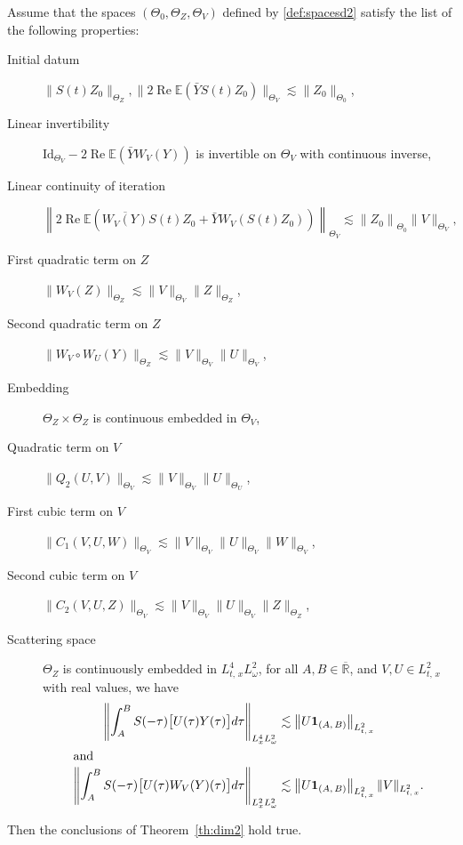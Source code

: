 \documentclass[10pt]{amsart}
\theoremstyle{definition}\newtheorem{defi}[theo]{Definition}\newtheorem{rema}[theo]{Remark}\newtheorem{exam}[theo]{Example}\newtheorem{exem}[theo]{Example}\newtheorem{nota}[theo]{Notation}
\newcommand{\R}{\mathbb{R}}
\newcommand{\E}{\mathbb{E}}
\DeclareMathOperator{\re}{Re}
\newcommand{\bfun}{\mathbf{1}}
\newcommand{\barR}{\overline{\R}}
\begin{document}
\begin{prop}\label{prop:principedim2}
Assume that the spaces $(\Theta_0,\Theta_Z,\Theta_V)$ defined by \eqref{def:spacesd2} satisfy the list of the following properties:
\begin{description}
\item[Initial datum] $\|S(t)Z_0\|_{\Theta_Z}, \|2\re \E(\bar Y S(t) Z_0)\|_{\Theta_V}\lesssim \|Z_0\|_{\Theta_0}$,
\item[Linear invertibility] $\textrm{Id}_{\Theta_V} - 2\re\E (\bar Y W_V(Y))$ is invertible on $\Theta_V$ with continuous inverse,
\item[Linear continuity of iteration]
\[
\left\|2\re \E \left(\overline{W_V(Y)} S(t) Z_0 + \bar Y W_V\left(S(t) Z_0\right)\right)\right\|_{\Theta_V} \lesssim \left\|Z_0\right\|_{\Theta_0} \|V\|_{\Theta_V},
\]
\item[First quadratic term on $Z$] $\|W_V(Z)\|_{\Theta_Z} \lesssim \|V\|_{\Theta_V}\|Z\|_{\Theta_Z}$,
\item[Second quadratic term on $Z$] $\|W_V\circ W_U (Y)\|_{\Theta_Z} \lesssim \|V\|_{\Theta_V}\|U\|_{\Theta_V}$,
\item[Embedding] $\Theta_Z \times \Theta_Z$ is continuous embedded in $\Theta_V$,
\item[Quadratic term on $V$] $\|Q_2(U,V)\|_{\Theta_V} \lesssim \|V\|_{\Theta_V}\|U\|_{\Theta_U}$,
\item[First cubic term on $V$] $\|C_1(V,U,W)\|_{\Theta_V} \lesssim \|V\|_{\Theta_V}\|U\|_{\Theta_V}\|W\|_{\Theta_V}$,
\item[Second cubic term on $V$] $\|C_2(V,U,Z)\|_{\Theta_V} \lesssim \|V\|_{\Theta_V}\|U\|_{\Theta_V}\|Z\|_{\Theta_Z}$,
\item[Scattering space] $\Theta_Z$ is continuously embedded in $L^4_{t,\,x} L^2_\omega$, for all $A,B \in \barR$, and $V,U \in L^2_{t,\,x}$ with real values, we have
\begin{align*}
\left\| \int_A^B S(-\tau) \big[U(\tau) Y(\tau) \big] d\tau \right\|_{L^4_x L^2_\omega} &\lesssim \left\|U\bfun_{(A,\,B)}\right\|_{L^2_{t,\,x}}
\\
\intertext{and}
\left\| \int_A^B S(-\tau) \big[U(\tau) W_V(Y)(\tau) \big] d\tau \right\|_{L^2_x L^2_\omega} &\lesssim \left\|U\bfun_{(A,\,B)}\right\|_{L^2_{t,\,x}}\|V\|_{L^2_{t,\,x}}.
\end{align*}
\end{description}
Then the conclusions of Theorem~\ref{th:dim2} hold true.
\end{prop}
\end{document}
